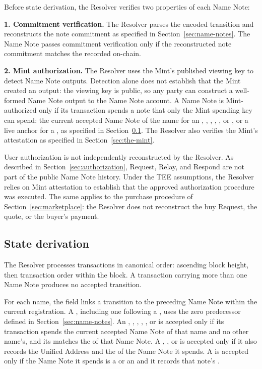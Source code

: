 Before state derivation, the Resolver verifies two properties of each Name Note:

\textbf{1. Commitment verification.} The Resolver parses the encoded transition and reconstructs the note commitment as specified in Section~\ref{sec:name-notes}. The Name Note passes commitment verification only if the reconstructed note commitment matches the  recorded on-chain.

\textbf{2. Mint authorization.} The Resolver uses the Mint's published viewing key to detect Name Note outputs. Detection alone does not establish that the Mint created an output: the viewing key is public, so any party can construct a well-formed Name Note output to the Name Note account. A Name Note is Mint-authorized only if its transaction spends a note that only the Mint spending key can spend: the current accepted Name Note of the name for an , , , , , or , or a live anchor for a , as specified in Section~\ref{sec:resolver-state}. The Resolver also verifies the Mint's attestation as specified in Section~\ref{sec:the-mint}.

User authorization is not independently reconstructed by the Resolver. As described in Section~\ref{sec:authorization}, Request, Relay, and Respond are not part of the public Name Note history. Under the TEE assumptions, the Resolver relies on Mint attestation to establish that the approved authorization procedure was executed. The same applies to the purchase procedure of Section~\ref{sec:marketplace}: the Resolver does not reconstruct the buy Request, the quote, or the buyer's payment.

\subsection{State derivation}
\label{sec:resolver-state}

The Resolver processes transactions in canonical order: ascending block height, then transaction order within the block. A transaction carrying more than one Name Note produces no accepted transition.

For each name, the  field links a transition to the preceding Name Note within the current registration. A , including one following a , uses the zero predecessor defined in Section~\ref{sec:name-notes}. An , , , , , or  is accepted only if its transaction spends the current accepted Name Note of that name and no other name's, and its  matches the  of that Name Note. A , , or  is accepted only if it also records the Unified Address and the  of the Name Note it spends. A  is accepted only if the Name Note it spends is a  or an  and it records that note's .

